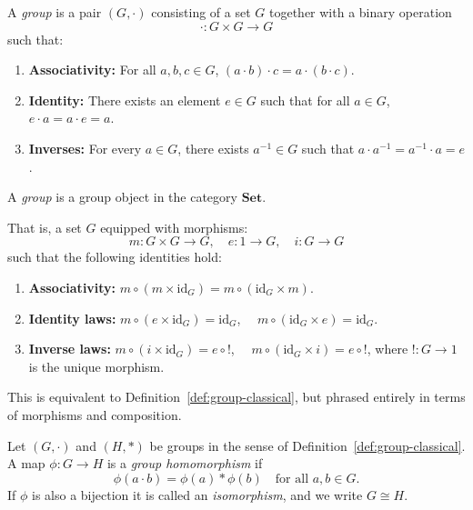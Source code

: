 
\begin{definition}
\label{def:group-classical}
A \emph{group} is a pair $(G,\cdot)$ consisting of a set $G$ together with a binary operation
\[
\cdot : G \times G \to G
\]
such that:
\begin{enumerate}
    \item \textbf{Associativity:} For all $a,b,c \in G$,
    $(a \cdot b)\cdot c = a \cdot (b \cdot c)$.

    \item \textbf{Identity:} There exists an element $e \in G$ such that for all $a \in G$,
    $e \cdot a = a \cdot e = a$.

    \item \textbf{Inverses:} For every $a \in G$, there exists $a^{-1} \in G$ such that
    $a \cdot a^{-1} = a^{-1} \cdot a = e$.
\end{enumerate}
\end{definition}

\begin{definition}
\label{def:group-categorical}
A \emph{group} is a group object in the category $\mathbf{Set}$.

That is, a set $G$ equipped with morphisms:
\[
m : G \times G \to G, \quad
e : 1 \to G, \quad
i : G \to G
\]
such that the following identities hold:

\begin{enumerate}
    \item \textbf{Associativity:}
    $m \circ (m \times \mathrm{id}_G) = m \circ (\mathrm{id}_G \times m)$.

    \item \textbf{Identity laws:}
    $m \circ (e \times \mathrm{id}_G) = \mathrm{id}_G$,
    $\quad m \circ (\mathrm{id}_G \times e) = \mathrm{id}_G$.

    \item \textbf{Inverse laws:}
    $m \circ (i \times \mathrm{id}_G) = e \circ !$,
    $\quad m \circ (\mathrm{id}_G \times i) = e \circ !$,
    where $! : G \to 1$ is the unique morphism.
\end{enumerate}

This is equivalent to Definition~\ref{def:group-classical}, but phrased entirely in terms of morphisms and composition.
\end{definition}

\begin{definition}
\label{def:group-hom}
Let $(G, \cdot)$ and $(H, \ast)$ be groups in the sense of Definition~\ref{def:group-classical}.
A map $\phi : G \to H$ is a \emph{group homomorphism} if
\[
  \phi(a \cdot b) = \phi(a) \ast \phi(b) \quad \text{for all } a, b \in G.
\]
If $\phi$ is also a bijection it is called an \emph{isomorphism}, and we write $G \cong H$.
\end{definition}

